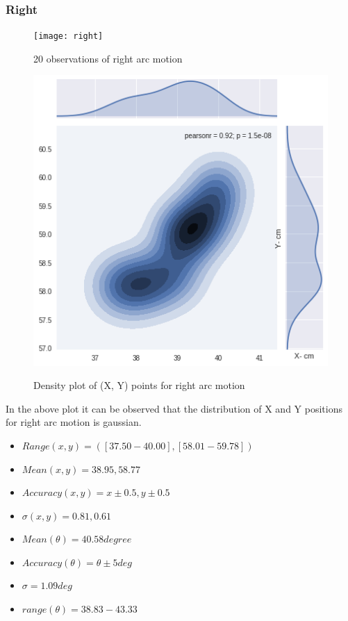 \documentclass[11pt,a4paper]{article}
\begin{document}
\begin{itemize}
\subsubsection{Right}
\begin{figure}[H]
\centering	
\texttt{[image: right]}
\label{fig:right}
\caption{20 observations of right arc motion}
\end{figure}

\begin{figure}[H]
\centering	
\includegraphics[width=0.8\linewidth]{rightG}
\label{fig:sub1}
\caption{Density plot of (X, Y) points for right arc motion}
\end{figure}

In the above plot it can be observed that the distribution of X and Y positions for right arc motion is gaussian.

\begin{itemize}
\item $ Range (x,y) =([37.50-40.00],[58.01-59.78])  $
\item $ Mean (x, y) = 38.95,58.77$
\item $ Accuracy (x,y) = x \pm0.5 , y \pm0.5  $ 
\item $ \sigma (x, y)= 0.81, 0.61 $
\item $ Mean(\theta) = 40.58 degree$
\item $ Accuracy (\theta)= \theta \pm5  deg $
\item $ \sigma = 1.09 deg$
\item $ range (\theta) = 38.83 - 43.33 $
\end{itemize}


\end{itemize}
\end{document}
